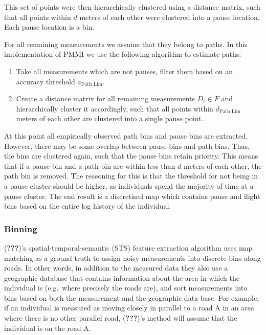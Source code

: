 \documentclass[man]{apa6}
\providecommand{\tightlist}{%
  \setlength{\itemsep}{0pt}\setlength{\parskip}{0pt}}
\theoremstyle{definition}
\theoremstyle{definition}
\theoremstyle{definition}
\theoremstyle{remark}
\begin{document}
This set of points were then hierarchically clustered using a distance
matrix, such that all points within \(d\) meters of each other were
clustered into a pause location. Each pause location is a bin.

For all remaining measurements we assume that they belong to paths. In
this implementation of PMMI we use the following algorithm to estimate
paths:

\begin{enumerate}
\def\labelenumi{\arabic{enumi}.}
\tightlist
\item
  Take all measurements which are not pauses, filter them based on an
  accuracy threshold \(a_{\text{Path Lim}}\).
\item
  Create a distance matrix for all remaining measurements \(D_t \in F\)
  and hierarchically cluster it accordingly, such that all points within
  \(d_{\text{Path Lim}}\) meters of each other are clustered into a
  single pause point.
\end{enumerate}

At this point all empirically observed path bins and pause bins are
extracted. However, there may be some overlap between pause bins and
path bins. Thus, the bins are clustered again, such that the pause bins
retain priority. This means that if a pause bin and a path bin are
within less than \(d\) meters of each other, the path bin is removed.
The reasoning for this is that the threshold for not being in a pause
cluster should be higher, as individuals spend the majority of time at a
pause cluster. The end result is a discretised map which contains pause
and flight bins based on the entire log history of the individual.

\subsubsection{Binning}\label{binning}

({\textbf{???}})'s spatial-temporal-semantic (STS) feature extraction
algorithm uses map matching as a ground truth to assign noisy
measurements into discrete bins along roads. In other words, in addition
to the measured data they also use a geographic database that contains
information about the area in which the individual is (e.g.~where
precisely the roads are), and sort measurements into bins based on both
the measurement and the geographic data base. For example, if an
individual is measured as moving closely in parallel to a road A in an
area where there is no other parallel road, ({\textbf{???}})'s method
will assume that the individual is on the road A.
\end{document}

